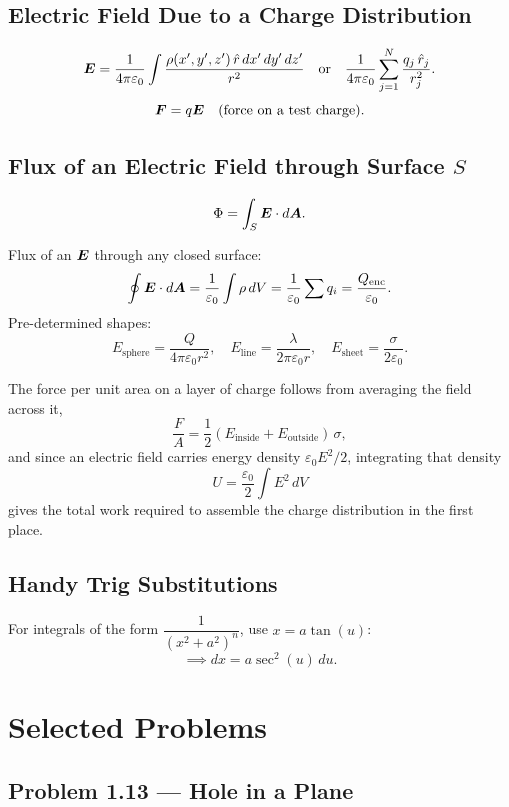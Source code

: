 \subsection{Electric Field Due to a Charge Distribution}
\[
    \vect{E} = \frac{1}{4\pi\varepsilon_0}\int \frac{\rho(x',y',z')\,\hat{r}\,dx'\,dy'\,dz'}{r^2}
    \quad \text{or} \quad
    \frac{1}{4\pi\varepsilon_0}\sum_{j=1}^{N}\frac{q_j\,\hat{r}_j}{r_j^2}.
\]
\[
    \vect{F} = q\vect{E} \quad \text{(force on a test charge)}.
\]

\subsection{Flux of an Electric Field through Surface $S$}
\[
    \Phi = \int_S \vect{E}\cdot d\vect{A}.
\]

\begin{fact}
Flux of an $\vect{E}$ through any closed surface:
\[
    \oint \vect{E}\cdot d\vect{A} = \frac{1}{\varepsilon_0}\int \rho\,dV = \frac{1}{\varepsilon_0}\sum q_i = \frac{Q_\text{enc}}{\varepsilon_0}.
\]
Pre-determined shapes:
\[
    E_\text{sphere} = \frac{Q}{4\pi\varepsilon_0 r^2}, \quad
    E_\text{line} = \frac{\lambda}{2\pi\varepsilon_0 r}, \quad
    E_\text{sheet} = \frac{\sigma}{2\varepsilon_0}.
\]
\end{fact}

The force per unit area on a layer of charge follows from averaging the field across it,
\[
    \frac{F}{A} = \frac{1}{2}(E_\text{inside} + E_\text{outside})\,\sigma,
\]
and since an electric field carries energy density $\varepsilon_0 E^2/2$, integrating that density
\[
    U = \frac{\varepsilon_0}{2}\int E^2\,dV
\]
gives the total work required to assemble the charge distribution in the first place.

\subsection{Handy Trig Substitutions}

For integrals of the form $\dfrac{1}{(x^2+a^2)^n}$, use $x = a\tan(u)$:
\[
    \implies dx = a\sec^2(u)\,du.
\]

\section{Selected Problems}

\subsection{Problem 1.13 --- Hole in a Plane}

